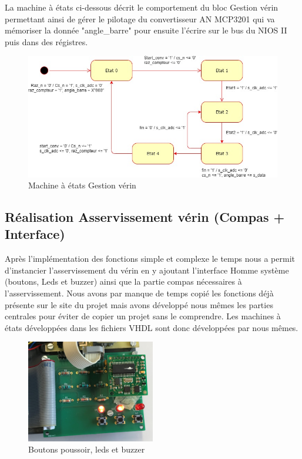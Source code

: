 La machine à états ci-dessous décrit le comportement du bloc Gestion vérin permettant ainsi de gérer le pilotage du convertisseur AN MCP3201 qui va mémoriser la donnée "angle\_barre" pour ensuite l'écrire sur le bus du NIOS II puis dans des régistres.
\vspace{1cm}
  \begin{figure}[h]
    \begin{center}
      \includegraphics[width=\textwidth]{images/MEF_verin.jpg}
      \caption{Machine à états Gestion vérin}
    \end{center}
  \end{figure}

  \newpage

  \subsection{Réalisation Asservissement vérin (Compas + Interface)}	
Après l'implémentation des fonctions simple et complexe le temps nous a permit d'instancier l'asservissement du vérin en y ajoutant l'interface Homme système (boutons, Leds et buzzer) ainsi que la partie compas nécessaires à l'asservissement. Nous avons par manque de temps copié les fonctions déjà présente sur le site du projet mais avons développé nous mêmes les parties centrales pour éviter de copier un projet sans le comprendre. Les machines à états développées dans les fichiers VHDL sont donc développées par nous mêmes. 	

\vspace{1cm}	
  \begin{figure}[h]	
    \begin{center}	
      \includegraphics[width=0.5\textwidth]{images/bp.jpg}	
      \caption{Boutons poussoir, leds et buzzer}	
    \end{center}	
  \end{figure}	

